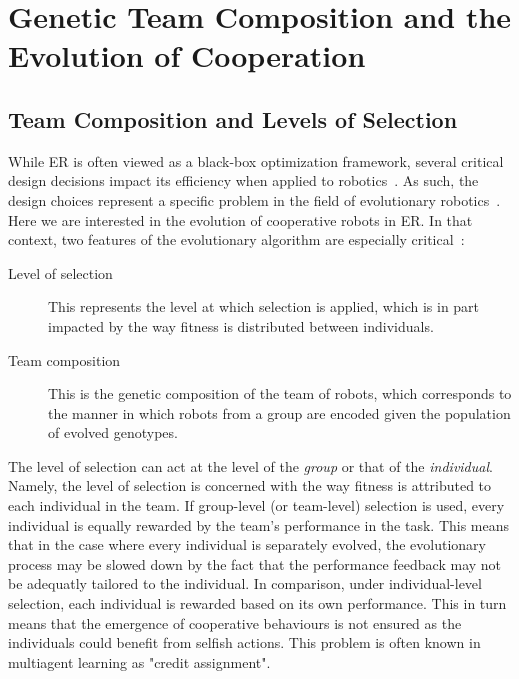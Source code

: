 

\section{Genetic Team Composition and the Evolution of Cooperation}

  \subsection{Team Composition and Levels of Selection}

    While ER is often viewed as a black-box optimization framework, several critical design decisions impact its efficiency when applied to robotics~\parencite{Trianni2014b}. As such, the design choices represent a specific problem in the field of evolutionary robotics~\parencite{Doncieux2014a}. Here we are interested in the evolution of cooperative robots in ER. In that context, two features of the evolutionary algorithm are especially critical~\parencite{Waibel2009, Lichocki2013}:

    \begin{description}
      \item[Level of selection] {This represents the level at which selection is applied, which is in part impacted by the way fitness is distributed between individuals.}

      \item[Team composition] {This is the genetic composition of the team of robots, which corresponds to the manner in which robots from a group are encoded given the population of evolved genotypes.}
    \end{description}

    The level of selection can act at the level of the \emph{group} or that of the \emph{individual}. Namely, the level of selection is concerned with the way fitness is attributed to each individual in the team. If group-level (or team-level) selection is used, every individual is equally rewarded by the team's performance in the task. This means that in the case where every individual is separately evolved, the evolutionary process may be slowed down by the fact that the performance feedback may not be adequatly tailored to the individual. In comparison, under individual-level selection, each individual is rewarded based on its own performance. This in turn means that the emergence of cooperative behaviours is not ensured as the individuals could benefit from selfish actions. This problem is often known in multiagent learning as "credit assignment".

